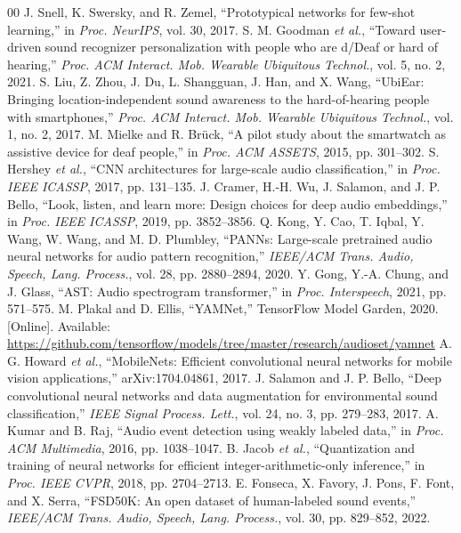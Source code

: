\documentclass[conference,a4paper]{IEEEtran}
\begin{document}
\begin{thebibliography}{00}
 J. Snell, K. Swersky, and R. Zemel, ``Prototypical networks for few-shot learning,'' in \textit{Proc. NeurIPS}, vol. 30, 2017.
 S. M. Goodman \textit{et al.}, ``Toward user-driven sound recognizer personalization with people who are d/Deaf or hard of hearing,'' \textit{Proc. ACM Interact. Mob. Wearable Ubiquitous Technol.}, vol. 5, no. 2, 2021.
 S. Liu, Z. Zhou, J. Du, L. Shangguan, J. Han, and X. Wang, ``UbiEar: Bringing location-independent sound awareness to the hard-of-hearing people with smartphones,'' \textit{Proc. ACM Interact. Mob. Wearable Ubiquitous Technol.}, vol. 1, no. 2, 2017.
 M. Mielke and R. Br\"uck, ``A pilot study about the smartwatch as assistive device for deaf people,'' in \textit{Proc. ACM ASSETS}, 2015, pp. 301--302.
 S. Hershey \textit{et al.}, ``CNN architectures for large-scale audio classification,'' in \textit{Proc. IEEE ICASSP}, 2017, pp. 131--135.
 J. Cramer, H.-H. Wu, J. Salamon, and J. P. Bello, ``Look, listen, and learn more: Design choices for deep audio embeddings,'' in \textit{Proc. IEEE ICASSP}, 2019, pp. 3852--3856.
 Q. Kong, Y. Cao, T. Iqbal, Y. Wang, W. Wang, and M. D. Plumbley, ``PANNs: Large-scale pretrained audio neural networks for audio pattern recognition,'' \textit{IEEE/ACM Trans. Audio, Speech, Lang. Process.}, vol. 28, pp. 2880--2894, 2020.
 Y. Gong, Y.-A. Chung, and J. Glass, ``AST: Audio spectrogram transformer,'' in \textit{Proc. Interspeech}, 2021, pp. 571--575.
 M. Plakal and D. Ellis, ``YAMNet,'' TensorFlow Model Garden, 2020. [Online]. Available: \url{https://github.com/tensorflow/models/tree/master/research/audioset/yamnet}
 A. G. Howard \textit{et al.}, ``MobileNets: Efficient convolutional neural networks for mobile vision applications,'' arXiv:1704.04861, 2017.
 J. Salamon and J. P. Bello, ``Deep convolutional neural networks and data augmentation for environmental sound classification,'' \textit{IEEE Signal Process. Lett.}, vol. 24, no. 3, pp. 279--283, 2017.
 A. Kumar and B. Raj, ``Audio event detection using weakly labeled data,'' in \textit{Proc. ACM Multimedia}, 2016, pp. 1038--1047.
 B. Jacob \textit{et al.}, ``Quantization and training of neural networks for efficient integer-arithmetic-only inference,'' in \textit{Proc. IEEE CVPR}, 2018, pp. 2704--2713.
 E. Fonseca, X. Favory, J. Pons, F. Font, and X. Serra, ``FSD50K: An open dataset of human-labeled sound events,'' \textit{IEEE/ACM Trans. Audio, Speech, Lang. Process.}, vol. 30, pp. 829--852, 2022.

\end{thebibliography}
\end{document}
